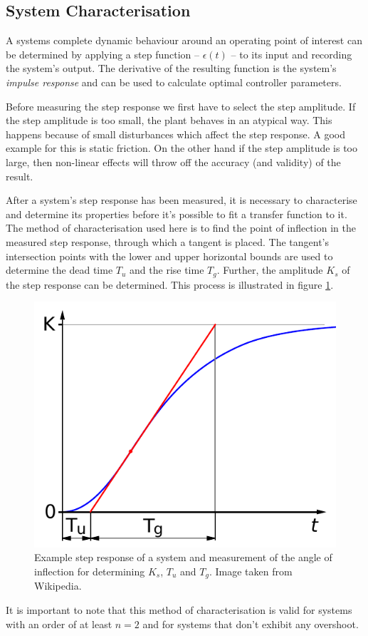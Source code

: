 \subsection{System Characterisation}
\label{sec:theory:characterisation}

A systems complete dynamic behaviour around an operating point of interest can
be determined by applying a step function -- $\epsilon(t)$ -- to its input and
recording the system's output. The derivative of the resulting function is the
system's  \textit{impulse  response}  and  can  be  used  to calculate optimal
controller parameters.

Before measuring the step response we first have to select the step amplitude.
If the step amplitude is too small, the plant behaves in an atypical way. This
happens because of small disturbances  which  affect the step response. A good
example for this is static friction. On the  other  hand if the step amplitude
is  too  large,  then  non-linear  effects  will throw off the  accuracy  (and
validity) of the result.

After  a system's  step  response  has  been  measured,  it  is  necessary  to
characterise  and  determine  its  properties before it's possible  to  fit  a
transfer function to it. The method  of  characterisation used here is to find
the point of inflection in the measured step response, through which a tangent
is placed.  The  tangent's  intersection  points  with  the  lower  and  upper
horizontal bounds  are used to determine the dead time $T_u$ and the rise time
$T_g$.  Further, the amplitude $K_s$ of the step response can  be  determined.
This process is illustrated in figure \ref{fig:tu-tg-example}.

\begin{figure}[t]
    \centering
    \includegraphics[width=\imagewidth]{images/tu_tg_example}
    \caption{Example step response of a system and measurement of the angle of inflection for determining $K_s$, $T_u$ and $T_g$. Image taken from Wikipedia\cite{ref:tu-tg}.}
    \label{fig:tu-tg-example}
\end{figure}

It is important to note that this method  of  characterisation  is  valid  for
systems with an order of at least $n=2$ and for systems that don't exhibit any
overshoot.

